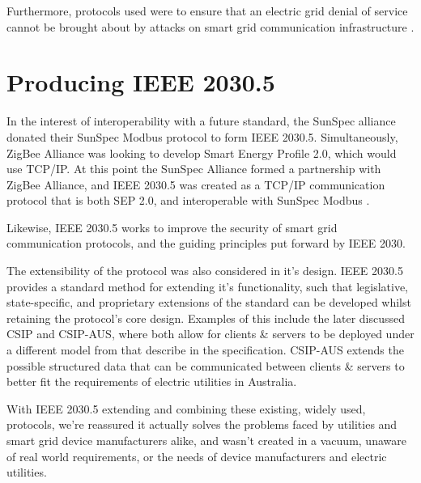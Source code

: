 Furthermore, protocols used were to ensure that an electric grid denial of service cannot be brought about by attacks on smart grid communication infrastructure \cite{2030Security} \cite[]{2030}. 


\section{Producing IEEE 2030.5}

In the interest of interoperability with a future standard, the SunSpec alliance donated their SunSpec Modbus protocol to form IEEE 2030.5. Simultaneously, ZigBee Alliance was looking to develop Smart Energy Profile 2.0, which would use TCP/IP.
At this point the SunSpec Alliance formed a partnership with ZigBee Alliance, and IEEE 2030.5 was created as a TCP/IP communication protocol that is both SEP 2.0, and interoperable with SunSpec Modbus \cite[]{SunspecModbusArticle}. 

Likewise, IEEE 2030.5 works to improve the security of smart grid communication protocols, and the guiding principles put forward by IEEE 2030. 

The extensibility of the protocol was also considered in it's design. IEEE 2030.5 provides a standard method for extending it's functionality, such that legislative, state-specific, and proprietary extensions of the standard can be developed whilst retaining the protocol's core design. Examples of this include the later discussed CSIP and CSIP-AUS, where both allow for clients \& servers to be deployed under a different model from that describe in the specification. CSIP-AUS extends the possible structured data that can be communicated between clients \& servers to better fit the requirements of electric utilities in Australia.

With IEEE 2030.5 extending and combining these existing, widely used, protocols, we're reassured it actually solves the problems faced by utilities and smart grid device manufacturers alike, and wasn't created in a vacuum, unaware of real world requirements, or the needs of device manufacturers and electric utilities.


